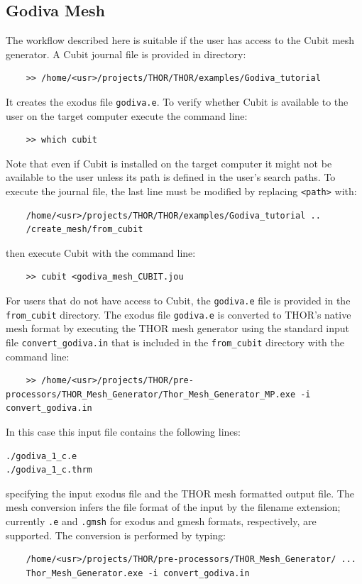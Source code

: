 \subsection{Godiva Mesh}
The workflow described here is suitable if the user has access to the Cubit mesh generator. A Cubit journal file is provided in directory:
\begin{verbatim}
    >> /home/<usr>/projects/THOR/THOR/examples/Godiva_tutorial
\end{verbatim}
It creates the exodus file \verb"godiva.e". To verify whether Cubit is available to the user on the target computer execute the command line:
\begin{verbatim}
    >> which cubit
\end{verbatim}
Note that even if Cubit is installed on the target computer it might not be available to the user unless its path is defined in the user's search paths. To execute the journal file, the last line must be modified by replacing \verb"<path>" with:
\begin{verbatim}
    /home/<usr>/projects/THOR/THOR/examples/Godiva_tutorial ..
    /create_mesh/from_cubit
\end{verbatim}
then execute Cubit with the command line:
\begin{verbatim}
    >> cubit <godiva_mesh_CUBIT.jou
\end{verbatim}
For users that do not have access to Cubit, the \verb"godiva.e" file is provided in the \verb"from_cubit" directory. 
The exodus file \verb"godiva.e" is converted to THOR's native mesh format by executing the THOR mesh generator using the standard input file \verb"convert_godiva.in" that is included in the \verb"from_cubit" directory with the command line:
\begin{verbatim}
    >> /home/<usr>/projects/THOR/pre-processors/THOR_Mesh_Generator/Thor_Mesh_Generator_MP.exe -i convert_godiva.in
\end{verbatim}
In this case this input file contains the following lines:
\begin{verbatim}
./godiva_1_c.e
./godiva_1_c.thrm
\end{verbatim}
specifying the input exodus file and the THOR mesh formatted output file. The mesh conversion infers the file format of the input by the filename extension; currently \verb".e" and \verb".gmsh" for exodus and gmesh formats, respectively, are supported. The conversion is performed by typing:
\begin{verbatim}
    /home/<usr>/projects/THOR/pre-processors/THOR_Mesh_Generator/ ...
    Thor_Mesh_Generator.exe -i convert_godiva.in
\end{verbatim}
